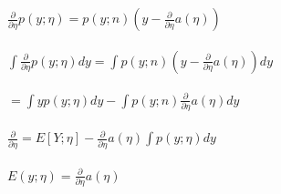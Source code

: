 \newcommand\tab[1][1cm]{\hspace*{#1}}
\begin{answer}
  \\ \\
  \tab[2.25cm]$\frac{\partial}{\partial\eta}p(y;\eta) = p(y;n)(y-\frac{\partial}{\partial\eta}a(\eta)) $ \\ \\
  \tab[2.25cm]$\int\frac{\partial}{\partial\eta}p(y;\eta)dy = \int p(y;n)(y-\frac{\partial}{\partial\eta}a(\eta))dy $ \\ \\
  \tab[3.75cm]$=\int yp(y;\eta)dy - \int p(y;n) \frac{\partial}{\partial\eta}a(\eta)dy$ \\ \\
   \tab[2.25cm]$ \frac{\partial}{\partial\eta} = E[Y;\eta] - \frac{\partial}{\partial\eta}a(\eta)\int p(y;\eta)dy$ \\ \\
   \tab[2.25cm]$ E(y;\eta) = \frac{\partial}{\partial\eta}a(\eta)$ \\ \\
\end{answer}
